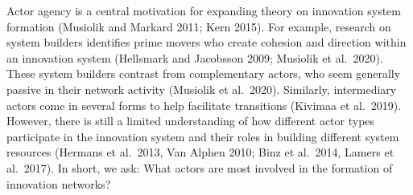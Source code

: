 \documentclass[twoside,12pt,final]{ucthesis-CA2012}
\begin{document}
\begin{ucmainmatter}
Actor agency is a central motivation for expanding theory on innovation
system formation (Musiolik and Markard 2011; Kern 2015). For example,
research on \textquotesingle system builders\textquotesingle{} identifies prime movers who create
cohesion and direction within an innovation system (Hellsmark and
Jacobsson 2009; Musiolik et al.~2020). These system builders contrast
from \textquotesingle complementary actors\textquotesingle, who seem generally passive in their
network activity (Musiolik et al.~2020). Similarly, \textquotesingle intermediary\textquotesingle{}
actors come in several forms to help facilitate transitions (Kivimaa et
al.~2019). However, there is still a limited understanding of how
different actor types participate in the innovation system and their
roles in building different system resources (Hermans et al.~2013, Van
Alphen 2010; Binz et al.~2014, Lamers et al.~2017). In short, we ask:
What actors are most involved in the formation of innovation networks?


\end{ucmainmatter}
\end{document}
